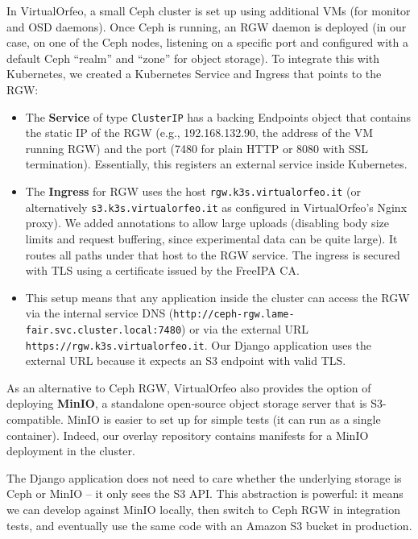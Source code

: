 In VirtualOrfeo, a small Ceph cluster is set up using additional VMs (for monitor 
and OSD daemons). Once Ceph is running, an RGW daemon is deployed (in our case, 
on one of the Ceph nodes, listening on a specific port and configured with a 
default Ceph ``realm'' and ``zone'' for object storage). To integrate this with 
Kubernetes, we created a Kubernetes Service and Ingress that points to the RGW:  

\begin{itemize}
	\item The \textbf{Service} of type \texttt{ClusterIP} has a backing Endpoints 
	object that contains the static IP of the RGW (e.g., 192.168.132.90, the 
	address of the VM running RGW) and the port (7480 for plain HTTP or 8080 with 
	SSL termination). Essentially, this registers an external service inside 
	Kubernetes.  
	\item The \textbf{Ingress} for RGW uses the host \texttt{rgw.k3s.virtualorfeo.it} 
	(or alternatively \texttt{s3.k3s.virtualorfeo.it} as configured in 
	VirtualOrfeo’s Nginx proxy). We added annotations to allow large uploads 
	(disabling body size limits and request buffering, since experimental data can 
	be quite large). It routes all paths under that host to the RGW service. The 
	ingress is secured with TLS using a certificate issued by the FreeIPA CA.  
	\item This setup means that any application inside the cluster can access the 
	RGW via the internal service DNS 
	(\texttt{http://ceph-rgw.lame-fair.svc.cluster.local:7480}) or via the 
	external URL \texttt{https://rgw.k3s.virtualorfeo.it}. Our Django application 
	uses the external URL because it expects an S3 endpoint with valid TLS.  
\end{itemize}

\medskip

As an alternative to Ceph RGW, VirtualOrfeo also provides the option of deploying 
\textbf{MinIO}, a standalone open-source object storage server that is 
S3-compatible. MinIO is easier to set up for simple tests (it can run as a 
single container). Indeed, our overlay repository contains manifests for a MinIO 
deployment in the cluster.  

The Django application does not need to care whether the underlying storage is 
Ceph or MinIO – it only sees the S3 API. This abstraction is powerful: it means 
we can develop against MinIO locally, then switch to Ceph RGW in integration 
tests, and eventually use the same code with an Amazon S3 bucket in production.

